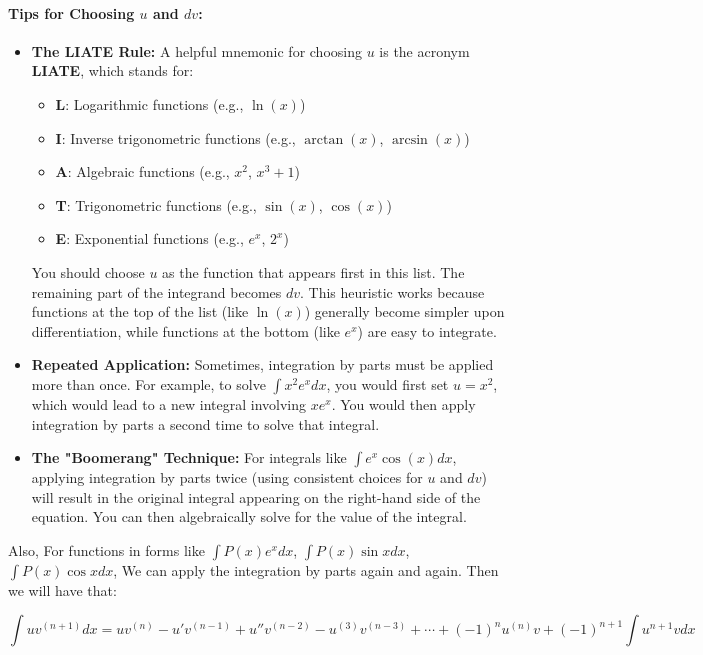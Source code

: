 \documentclass[oneside]{book}
\begin{document}
\paragraph*{Tips for Choosing $u$ and $dv$:}
\begin{itemize}
    \item \textbf{The LIATE Rule:} A helpful mnemonic for choosing $u$ is the acronym \textbf{LIATE}, which stands for:
    \begin{itemize}
        \item \textbf{L}: Logarithmic functions (e.g., $\ln(x)$)
        \item \textbf{I}: Inverse trigonometric functions (e.g., $\arctan(x)$, $\arcsin(x)$)
        \item \textbf{A}: Algebraic functions (e.g., $x^2$, $x^3+1$)
        \item \textbf{T}: Trigonometric functions (e.g., $\sin(x)$, $\cos(x)$)
        \item \textbf{E}: Exponential functions (e.g., $e^x$, $2^x$)
    \end{itemize}
    You should choose $u$ as the function that appears first in this list. The remaining part of the integrand becomes $dv$. This heuristic works because functions at the top of the list (like $\ln(x)$) generally become simpler upon differentiation, while functions at the bottom (like $e^x$) are easy to integrate.

    \item \textbf{Repeated Application:} Sometimes, integration by parts must be applied more than once. For example, to solve $\int x^2 e^x dx$, you would first set $u=x^2$, which would lead to a new integral involving $x e^x$. You would then apply integration by parts a second time to solve that integral.

    \item \textbf{The "Boomerang" Technique:} For integrals like $\int e^x \cos(x) dx$, applying integration by parts twice (using consistent choices for $u$ and $dv$) will result in the original integral appearing on the right-hand side of the equation. You can then algebraically solve for the value of the integral.
\end{itemize}

Also, For functions in forms like $\int P(x) e^x dx$, $\int P(x) \sin x dx$, $\int P(x) \cos x dx$, We can apply the integration by parts again and again. Then we will have that:

\[
\int u v^{(n+1)} dx = u v^{(n)} - u'v^{(n-1)} +u''v^{(n-2)} - u^{(3)}v^{(n-3)} + \cdots + (-1)^n u^{(n)} v + (-1)^{n+1} \int u^{n+1} v dx
\]
\end{document}
